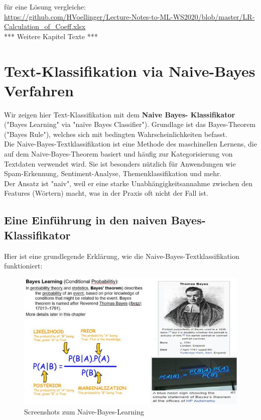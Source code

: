 \documentclass[12pt]{article}
\begin{document}
für eine Lösung vergleiche:\\
\url{https://github.com/HVoellinger/Lecture-Notes-to-ML-WS2020/blob/master/LR-Calculation_of_Coeff.xlsx}
\\

*** Weitere Kapitel Texte *** 

\newpage


\section{Text-Klassifikation via Naive-Bayes Verfahren \\}


Wir zeigen hier Text-Klassifikation mit dem \textbf{Naive Bayes- Klassifikator} ("Bayes Learning" via "naïve Bayes Classifier"). Grundlage ist das Bayes-Theorem ("Bayes Rule"), welches sich mit bedingten Wahrscheinlichkeiten befasst.\\
Die Naive-Bayes-Textklassifikation ist eine Methode des maschinellen Lernens, die auf dem Naive-Bayes-Theorem basiert und häufig zur Kategorisierung von Textdaten verwendet wird. Sie ist besonders nützlich für Anwendungen wie Spam-Erkennung, Sentiment-Analyse, Themenklassifikation und mehr.\\

Der Ansatz ist "naiv", weil er eine starke Unabhängigkeitsannahme zwischen den Features (Wörtern) macht, was in der Praxis oft nicht der Fall ist.

\subsection{Eine Einführung in den naiven Bayes-Klassifikator}

Hier ist eine grundlegende Erklärung, wie die Naive-Bayes-Textklassifikation funktioniert:\\
\begin{figure}[htp]
  \centering
  \hspace*{-1.5cm} 
  \includegraphics[width=1.2\textwidth]{Naive-Bayes-Learning}
  \caption{Screenshots zum Naive-Bayes-Learning}
\label{fig:NB_Learning}
\end{figure}
\end{document}
